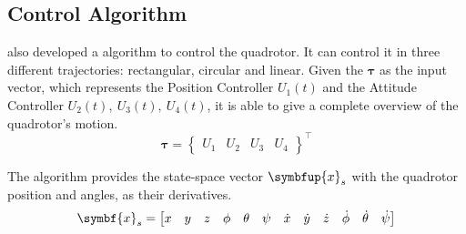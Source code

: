 
\subsection{Control Algorithm}

\citet{geronel2023} also developed a \matlab algorithm to control the quadrotor. It can control it in three different trajectories: rectangular, circular and linear.
Given the \(\symbf{\tau}\) as the input vector, which represents the Position Controller \(U_1(t)\) and the Attitude Controller \(U_2(t),\ U_3(t),\ U_4(t)\), it is able to give a complete overview of the quadrotor's motion.
%
\begin{equation}
    \symbf{\tau} = \begin{Bmatrix}
        U_1 & U_2 & U_3 & U_4
    \end{Bmatrix}^{\intercal}
\end{equation}

The algorithm provides the state-space vector \(\symbfup{x}_s\) with the quadrotor position and angles, as their derivatives.
%
\begin{equation}\setcounter{MaxMatrixCols}{13}
    \symbf{x}_s =
    \begin{bmatrix}
        x&y&z&\phi&\theta&\psi&\dot{x}&\dot{y}&\dot{z}&\dot{\phi}&\dot{\theta}&\dot{\psi}
    \end{bmatrix}        
    \label{eq:xs_vector_matlab}
\end{equation}